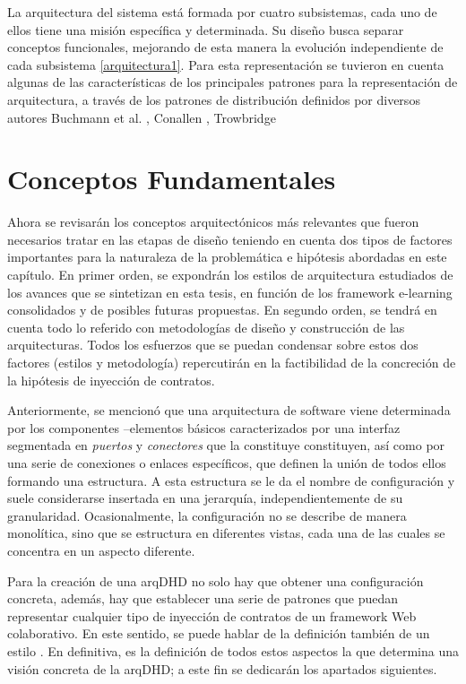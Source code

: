 La arquitectura del sistema está formada por cuatro subsistemas, cada uno de
ellos tiene una misión específica y determinada. Su diseño busca separar conceptos funcionales,
mejorando de esta manera la evolución independiente de cada subsistema
\ref{arquitectura1}. Para esta representación se tuvieron en cuenta algunas de
las características de los principales patrones para la representación de
arquitectura, a través de los patrones de distribución definidos por diversos
autores Buchmann et al. \cite{Buchmann}, Conallen \cite{Conallen}, Trowbridge\cite{Trowbridge}


\section {Conceptos Fundamentales}


Ahora se revisarán los conceptos arquitectónicos más relevantes que fueron
necesarios tratar en las etapas de diseño teniendo en cuenta dos tipos de factores importantes para la naturaleza de la problemática e hipótesis abordadas en este capítulo. En primer orden, se expondrán los estilos de arquitectura estudiados de los avances que se sintetizan en esta tesis, en función de los framework e-learning consolidados y de posibles futuras propuestas. En segundo orden, se tendrá en cuenta todo lo referido con metodologías de diseño y construcción de las arquitecturas. Todos los esfuerzos que se puedan condensar sobre estos dos factores (estilos y metodología) repercutirán en la factibilidad de la concreción de la hipótesis de inyección de contratos.   

Anteriormente, se mencionó que una arquitectura de software
viene determinada por los componentes –elementos básicos caracterizados por una
interfaz segmentada en \textit{puertos} y \textit{conectores} que la constituye
constituyen, así como por una serie de conexiones o enlaces específicos, que
definen la unión de todos ellos formando una estructura. A esta estructura se
le da el nombre de configuración y suele considerarse insertada en una
jerarquía, independientemente de su granularidad. Ocasionalmente, la
configuración no se describe de manera monolítica, sino que se estructura en
diferentes vistas, cada una de las cuales se concentra en un aspecto diferente.

Para la creación de una arqDHD no solo hay que obtener una configuración concreta, además, hay que establecer una serie de patrones que puedan representar cualquier tipo de inyección de contratos de un framework Web colaborativo. En este sentido, se puede hablar de la definición también de un estilo \cite{arqEstilos}. En definitiva, es la definición de todos
estos aspectos la que determina una visión concreta de la arqDHD; a este fin se dedicarán los apartados siguientes.



